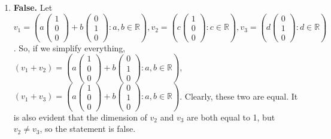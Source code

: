 \documentclass{article}
\begin{document}
\begin{enumerate}
\begin{enumerate}
\item \textbf{False.}  Let $v_1 = ( a \left(\begin{array}{c} 1 \\ 0 \\ 0 \end{array}\right) + b \left(\begin{array}{c} 0 \\ 1 \\ 0 \end{array}\right) : a,b \in \mathbb{R} ), v_2 = ( c \left(\begin{array}{c} 1 \\ 0 \\ 0 \end{array}\right) : c \in \mathbb{R} ), v_3 = ( d \left(\begin{array}{c} 0 \\ 1 \\ 0 \end{array}\right) : d \in \mathbb{R} )$. So, if we simplify everything, \\ $(v_1 + v_2) =  (a \left(\begin{array}{c} 1 \\ 0 \\ 0 \end{array}\right) + b \left(\begin{array}{c} 0 \\ 1 \\ 0 \end{array}\right) : a,b \in \mathbb{R})$, \\ $(v_1 + v_3) = (a \left(\begin{array}{c} 1 \\ 0 \\ 0 \end{array}\right) + b \left(\begin{array}{c} 0 \\ 1 \\ 0 \end{array}\right) : a,b \in \mathbb{R})$. Clearly, these two are equal. It is also evident that the dimension of $v_2$ and $v_3$ are both equal to 1, but $v_2 \neq v_3$, so the statement is false.

\end{enumerate}

\end{enumerate}
\end{document}
